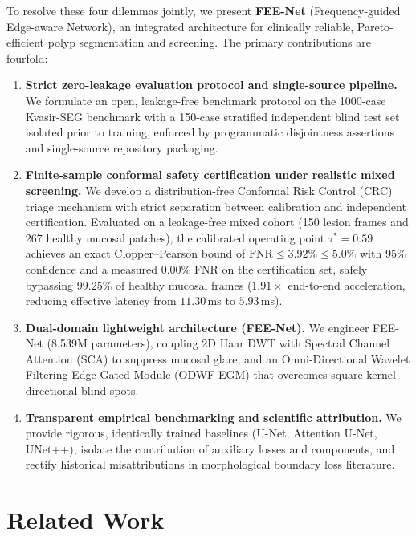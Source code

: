 \documentclass[journal]{IEEEtran}
\begin{document}
To resolve these four dilemmas jointly, we present \textbf{FEE-Net} (Frequency-guided Edge-aware Network), an integrated architecture for clinically reliable, Pareto-efficient polyp segmentation and screening. The primary contributions are fourfold:
\begin{enumerate}
    \item \textbf{Strict zero-leakage evaluation protocol and single-source pipeline.} We formulate an open, leakage-free benchmark protocol on the 1000-case Kvasir-SEG benchmark with a 150-case stratified independent blind test set isolated prior to training, enforced by programmatic disjointness assertions and single-source repository packaging.
    \item \textbf{Finite-sample conformal safety certification under realistic mixed screening.} We develop a distribution-free Conformal Risk Control (CRC) triage mechanism with strict separation between calibration and independent certification. Evaluated on a leakage-free mixed cohort (150 lesion frames and 267 healthy mucosal patches), the calibrated operating point $\tau^{*}=0.59$ achieves an exact Clopper--Pearson bound of $\mathrm{FNR} \le 3.92\% \le 5.0\%$ with $95\%$ confidence and a measured $0.00\%$ FNR on the certification set, safely bypassing $99.25\%$ of healthy mucosal frames ($1.91\times$ end-to-end acceleration, reducing effective latency from $11.30$\,ms to $5.93$\,ms).
    \item \textbf{Dual-domain lightweight architecture (FEE-Net).} We engineer FEE-Net (8.539M parameters), coupling 2D Haar DWT with Spectral Channel Attention (SCA) to suppress mucosal glare, and an Omni-Directional Wavelet Filtering Edge-Gated Module (ODWF-EGM) that overcomes square-kernel directional blind spots.
    \item \textbf{Transparent empirical benchmarking and scientific attribution.} We provide rigorous, identically trained baselines (U-Net, Attention U-Net, UNet++), isolate the contribution of auxiliary losses and components, and rectify historical misattributions in morphological boundary loss literature.
\end{enumerate}

\section{Related Work}
\end{document}
